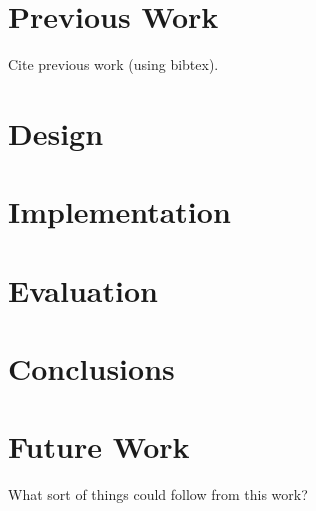 \documentclass[MSc,12pt]{wsuthesis}
\begin{document}
\chapter{Previous Work}

Cite previous work (using bibtex).

\chapter{Design}




\chapter{Implementation}



\chapter{Evaluation}



\chapter{Conclusions}



\chapter{Future Work}

What sort of things could follow from this work?

\newpage
\singlespacing



\appendix
% 
\end{document}
